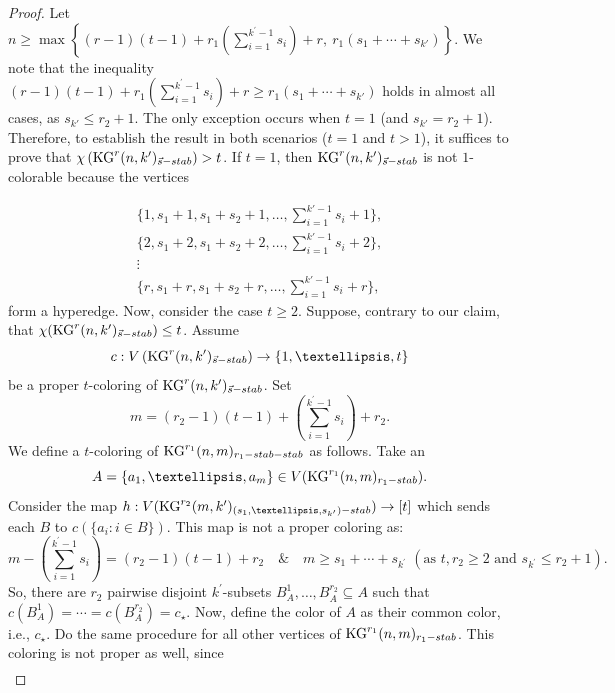 \documentclass[10pt,a4paper]{amsart}
\begin{document}
\begin{proof}
Let \(n \geq \max\left\{(r-1)(t-1) + r_1\left(\sum_{i=1}^{k^{\prime}-1}s_i\right) + r,\ r_1(s_1 + \cdots + s_{k'})\right\}\). We note that the inequality \((r-1)(t-1) + r_1\left(\sum_{i=1}^{k^{\prime}-1}s_i\right) + r \geq r_1(s_1 + \cdots + s_{k'})\) holds in almost all cases, as \(s_{k'} \leq r_2 + 1\). The only exception occurs when \(t=1\) (and \(s_{k'}=r_2+1\)). Therefore, to establish the result in both scenarios (\(t=1\) and \(t>1\)), it suffices to prove that \(\chi \left(\mathrm{KG}^{r}(n,k^{\prime})_{\vec{s}\textup{-stab}}\right) > t\). If $t = 1$, then $\mathrm{KG}^{r}(n,k')_{\vec{s}\textup{-stab}}$ is not $1$-colorable because the vertices 

\[
\begin{array}{c}
\{1, s_1+1, s_1+s_2+1, \ldots, \textstyle\sum_{i=1}^{k'-1}s_i+1\}, \\
\{2, s_1+2, s_1+s_2+2, \ldots, \textstyle\sum_{i=1}^{k'-1}s_i+2\}, \\
\vdots \\
\{r, s_1+r, s_1+s_2+r, \ldots, \textstyle\sum_{i=1}^{k'-1}s_i+r\},
\end{array}
\]
form a hyperedge. Now, consider the case $t \geq 2$. Suppose, contrary to our claim, that $\chi (\mathrm{KG}^{r}(n,k^{\prime})_{\vec{s}\textup{-stab}})\leq t$. Assume
\[
c : V\left(\mathrm{KG}^{r}(n,k^{\prime})_{\vec{s}\textup{-stab}}\right)\to\{1,\ldots, t\}
\]
be a proper $t$-coloring of $\mathrm{KG}^{r}(n,k^{\prime})_{\vec{s}\textup{-stab}}$. Set 
\[
m= (r_2-1)(t-1)+ \left(\sum_{i=1}^{k^{\prime}-1}s_i\right) + r_2.
\]
We define a $t$-coloring of $\mathrm{KG}^{r_1}(n,m)_{r_1\textup{-stab}\textup{-stab}}$ as follows. Take an 
\[
A=\{a_1,\ldots, a_m\}\in V(\mathrm{KG}^{r_1}(n,m)_{r_1\textup{-stab}}).
\] 
Consider the map $h: V(\mathrm{KG}^{r_2}(m,k^{\prime})_{(s_1,\ldots, s_{k^{\prime}})\textup{-stab}})\to [t]$ which sends each $B$ to $c(\{a_i : i\in B\})$. This map is not a proper coloring as:
\[
m-\left(\sum_{i=1}^{k^{\prime}-1}s_i\right)= (r_2-1)(t-1) + r_2 \quad \& \quad m\geq s_1+\cdots +s_{k^{\prime}}\,\, (\text{as} \,\,t, r_2\geq 2\,\, \text{and}\,\, s_{k^{\prime}}\leq r_2+1 ).
\]
So, there are $r_2$ pairwise disjoint $k^{\prime}$-subsets $B_A^1, \ldots, B_A^{r_2}\subseteq A$ such that $c(B_A^1)=\cdots =c(B_A^{r_2})= c_{\star}$. Now, define the color of $A$ as their common color, i.e., $c_{\star}$. Do the same procedure for all other vertices of $\mathrm{KG}^{r_1}(n,m)_{r_1\textup{-stab}}$. This coloring is not proper as well, since
\begin{align*}

\end{align*}
\end{proof}
\end{document}
